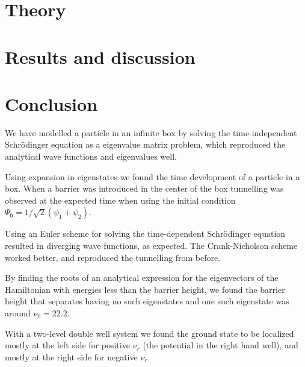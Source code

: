 \documentclass[a4paper,twocolumn]{article}
\begin{document}


\section*{Theory}


\section*{Results and discussion}


\section*{Conclusion}
We have modelled a particle in an infinite box by solving the time-independent Schrödinger equation as a eigenvalue matrix problem, which reproduced the analytical wave functions and eigenvalues well.

Using expansion in eigenstates we found the time development of a particle in a box. When a barrier was introduced in the center of the box tunnelling was observed at the expected time when using the initial condition $\Psi_0 = 1/\sqrt{2}(\psi_1 + \psi_2)$.

Using an Euler scheme for solving the time-dependent Schrödinger equation resulted in diverging wave functions, as expected. The Crank-Nicholson scheme worked better, and reproduced the tunnelling from before.

By finding the roots of an analytical expression for the eigenvectors of the Hamiltonian with energies less than the barrier height, we found the barrier height that separates having no such eigenstates and one such eigenstate was around $\nu_0 = 22.2$.

With a two-level double well system we found the ground state to be localized mostly at the left side for positive $\nu_r$ (the potential in the right hand well), and mostly at the right side for negative $\nu_r$.




\printbibliography[title=References]
\end{document}
